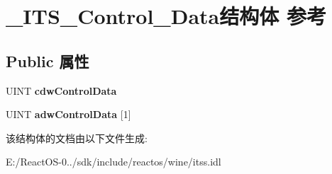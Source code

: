 \hypertarget{struct___i_t_s___control___data}{}\section{\+\_\+\+I\+T\+S\+\_\+\+Control\+\_\+\+Data结构体 参考}
\label{struct___i_t_s___control___data}
\subsection*{Public 属性}
\begin{DoxyCompactItemize}
\item 
\mbox{\label{struct___i_t_s___control___data_a8aae257cc2ac91d7db7bd9c4a6978264}} 
U\+I\+NT {\bfseries cdw\+Control\+Data}
\item 
\mbox{\label{struct___i_t_s___control___data_a27a97c3af402840a4edd06849c7f5228}} 
U\+I\+NT {\bfseries adw\+Control\+Data} \mbox{[}1\mbox{]}
\end{DoxyCompactItemize}


该结构体的文档由以下文件生成\+:\begin{DoxyCompactItemize}
\item 
E\+:/\+React\+O\+S-\/0../sdk/include/reactos/wine/itss.\+idl\end{DoxyCompactItemize}
